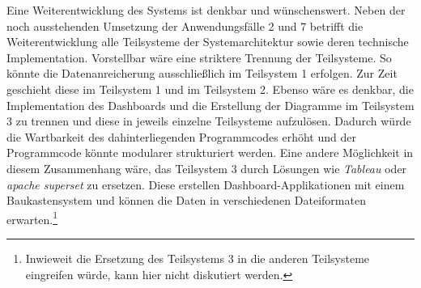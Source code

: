 

Eine Weiterentwicklung des Systems ist denkbar und wünschenswert. 
Neben der noch ausstehenden Umsetzung der Anwendungsfälle 2 und 7 betrifft die Weiterentwicklung alle Teilsysteme der Systemarchitektur
sowie deren technische Implementation. Vorstellbar wäre eine striktere Trennung der Teilsysteme. 
So könnte die Datenanreicherung ausschließlich im Teilsystem 1 erfolgen. Zur Zeit geschieht diese im Teilsystem 1 und im Teilsystem 2. 
Ebenso wäre es denkbar, die Implementation des Dashboards und die Erstellung der Diagramme im Teilsystem 3 zu trennen und diese in jeweils einzelne Teilsysteme
aufzulösen. Dadurch würde die Wartbarkeit des dahinterliegenden Programmcodes erhöht und der Programmcode könnte modularer strukturiert werden.
Eine andere Möglichkeit in diesem Zusammenhang wäre, das Teilsystem 3 durch Lösungen wie \textit{Tableau} oder \textit{apache superset} zu ersetzen.
Diese erstellen Dashboard-Applikationen mit einem Baukastensystem und können die Daten in verschiedenen Dateiformaten erwarten.\footnote{ Inwieweit die Ersetzung des Teilsystems 3 in die anderen Teilsysteme eingreifen würde, kann
hier nicht diskutiert werden.}

